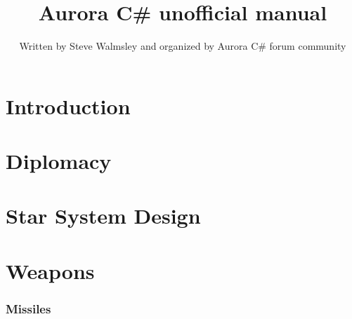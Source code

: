 \documentclass[10pt,a4paper,oneside]{article}
\author{Written by Steve Walmsley and organized by Aurora C\# forum community}
\title{Aurora C\# unofficial manual}
\begin{document}
\maketitle
\newpage
\tableofcontents


\newpage
\part{Introduction}




\newpage
\part{Diplomacy}










\newpage
\part{Star System Design}









\newpage
\part{Weapons}

\section{Missiles}






\end{document}
